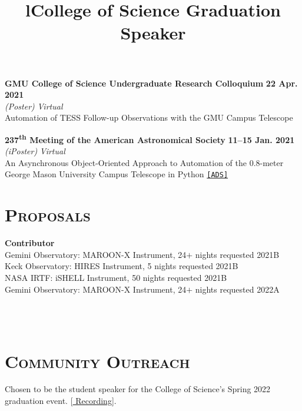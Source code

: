 \documentclass[marg, centered]{res}
\begin{document}
\begin{resume}
\begin{etaremune}
\item \textbf{GMU College of Science Undergraduate Research Colloquium} \hfill \textbf{22 Apr. 2021}\\
\textit{(Poster)} \hfill \textit{Virtual}\\
Automation of TESS Follow-up Observations with the GMU Campus Telescope

\item \textbf{237\textsuperscript{th} Meeting of the American Astronomical Society} \hfill \textbf{11--15 Jan. 2021}\\
\textit{(iPoster)} \hfill \textit{Virtual}\\
An Asynchronous Object-Oriented Approach to Automation of the 0.8-meter\\ George Mason University Campus Telescope in Python \href{https://ui.adsabs.harvard.edu/abs/2021AAS...23734407R/abstract}{\texttt{[ADS]}}

\end{etaremune}


\section{{\scshape \bfseries Proposals}}
\textbf{Contributor} \\
Gemini Observatory: MAROON-X Instrument, 24$+$ nights requested \hfill 2021B \\
Keck Observatory: HIRES Instrument, 5 nights requested \hfill 2021B \\
NASA IRTF: iSHELL Instrument, 50 nights requested \hfill 2021B \\
Gemini Observatory: MAROON-X Instrument, 24$+$ nights requested \hfill 2022A \\

\begin{format}
\title{l} \\
 \\
\body
\end{format}

\section{{\scshape \bfseries Community Outreach}}

\title{\textbf{College of Science Graduation Speaker}}
\begin{position}
Chosen to be the student speaker for the College of Science's Spring 2022 graduation event. [\href{https://www.youtube.com/watch?v=xsyi9sqYH4o}{\color{dkbu} Recording}].
\end{position}


\end{resume}
\end{document}
